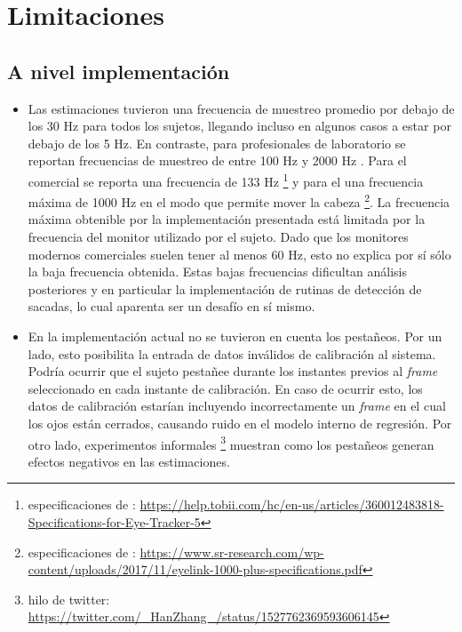 \section{Limitaciones}

\subsection{A nivel implementación}

  \begin{itemize}

    \item
      Las estimaciones tuvieron una frecuencia de muestreo promedio por debajo
      de los 30 Hz para todos los sujetos, llegando incluso en algunos casos a
      estar por debajo de los 5 Hz.
      En contraste, para \eyetrackers profesionales de laboratorio se reportan
      frecuencias de muestreo de entre 100 Hz y 2000 Hz
      \cite{hosp_2020_remote_eye}.
      Para el \eyetracker comercial \tobii se reporta una frecuencia de 133 Hz
      \footnote{
        especificaciones de \tobii:
        \url{https://help.tobii.com/hc/en-us/articles/360012483818-Specifications-for-Eye-Tracker-5}
      } y para el \eyelink una frecuencia máxima de 1000 Hz en el modo que
      permite mover la cabeza \footnote{
        especificaciones de \eyelink:
        \url{https://www.sr-research.com/wp-content/uploads/2017/11/eyelink-1000-plus-specifications.pdf}
      }.
      La frecuencia máxima obtenible por la implementación presentada está
      limitada por la frecuencia del monitor utilizado por el sujeto.
      Dado que los monitores modernos comerciales suelen tener al menos 60 Hz,
      esto no explica por sí sólo la baja frecuencia obtenida.
      Estas bajas frecuencias dificultan análisis posteriores y en particular
      la implementación de rutinas de detección de sacadas, lo cual aparenta
      ser un desafío en sí mismo.
  
    \item
      En la implementación actual no se tuvieron en cuenta los pestañeos.
      Por un lado, esto posibilita la entrada de datos inválidos de calibración
      al sistema.
      Podría ocurrir que el sujeto pestañee durante los instantes previos al
      \textit{frame} seleccionado en cada instante de calibración.
      En caso de ocurrir esto, los datos de calibración estarían incluyendo
      incorrectamente un \textit{frame} en el cual los ojos están cerrados,
      causando ruido en el modelo interno de regresión.
      Por otro lado, experimentos informales \footnote{
        hilo de twitter:
        \url{https://twitter.com/_HanZhang_/status/1527762369593606145}
      } muestran como los pestañeos generan efectos negativos en las
      estimaciones.
  

\end{itemize}
